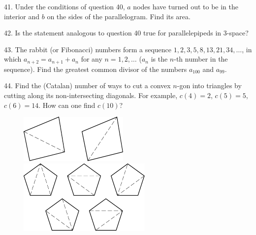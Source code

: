 \begin{problem}{41.}
	Under the conditions of question 40, $a$ nodes have turned out to be in the interior and $b$ on the sides of the parallelogram. Find its area.
\end{problem}

\begin{problem}{42.}
	Is the statement analogous to question 40 true for parallelepipeds in 3-space?
\end{problem}

\begin{problem}{43.}
	The rabbit (or Fibonacci) numbers form a sequence $1,2,3,5,8,\allowbreak 13,21,34,\dotsc$, in which $a_{n+2}=a_{n+1}+a_n$ for any
	$n=1,2,\dotsc$ ($a_n$ is the $n$-th number in the sequence). Find the greatest common divisor of the numbers $a_{100}$ and $a_{99}$.
\end{problem}

\begin{problem}{44.}
	Find the (Catalan) number of ways to cut a convex $n$-gon into triangles by cutting along its non-intersecting diagonals.
	For example, $c(4)=2$, $c(5)=5$, $c(6)=14$. How can one find $c(10)$?
	\begin{figure}
		\includegraphics{resources/taskbook-281}
		\qquad
		\includegraphics{resources/taskbook-282}
	\end{figure}
\end{problem}

